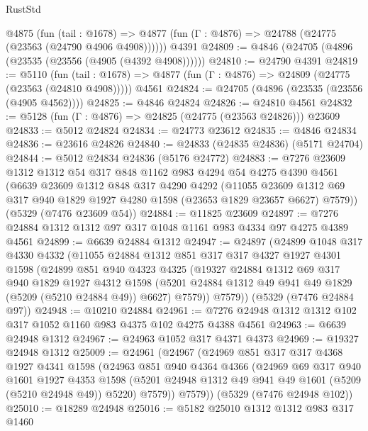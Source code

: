 \begin{lexlean}{RustStd}
\begin{coremodule}
    @4875
      (fun (tail : @1678) =>
      @4877 (fun (Γ : @4876) => @24788 (@24775 (@23563 (@24790 @4906 @4908))))))
    @4391
@24809 := @4846 (@24705 (@4896 (@23535 (@23556 (@4905 (@4392 @4908))))))
@24810 := @24790 @4391
@24819 := @5110
    (fun (tail : @1678) => @4877 (fun (Γ : @4876) => @24809 (@24775 (@23563 (@24810 @4908)))))
    @4561
@24824 := @24705 (@4896 (@23535 (@23556 (@4905 @4562))))
@24825 := @4846 @24824
@24826 := @24810 @4561
@24832 := @5128 (fun (Γ : @4876) => @24825 (@24775 (@23563 @24826))) @23609
@24833 := @5012 @24824
@24834 := @24773 @23612
@24835 := @4846 @24834
@24836 := @23616 @24826
@24840 := @24833 (@24835 @24836) (@5171 @24704)
@24844 := @5012 @24834 @24836 (@5176 @24772)
@24883 := @7276
    @23609
    @1312
    @1312
    @54
    @317
    @848
    @1162
    @983
    @4294
    @54
    @4275
    @4390
    @4561
    (@6639
      @23609
      @1312
      @848
      @317
      @4290
      @4292
      (@11055 @23609 @1312 @69 @317 @940 @1829 @1927 @4280 @1598 (@23653 @1829 @23657 @6627) @7579))
    (@5329 (@7476 @23609 @54))
@24884 := @11825 @23609
@24897 := @7276 @24884 @1312 @1312 @97 @317 @1048 @1161 @983 @4334 @97 @4275 @4389 @4561
@24899 := @6639 @24884 @1312
@24947 := @24897
    (@24899
      @1048
      @317
      @4330
      @4332
      (@11055
        @24884
        @1312
        @851
        @317
        @317
        @4327
        @1927
        @4301
        @1598
        (@24899
          @851
          @940
          @4323
          @4325
          (@19327
            @24884
            @1312
            @69
            @317
            @940
            @1829
            @1927
            @4312
            @1598
            (@5201 @24884 @1312 @49 @941 @49 @1829 (@5209 (@5210 @24884 @49)) @6627)
            @7579))
        @7579))
    (@5329 (@7476 @24884 @97))
@24948 := @10210 @24884
@24961 := @7276 @24948 @1312 @1312 @102 @317 @1052 @1160 @983 @4375 @102 @4275 @4388 @4561
@24963 := @6639 @24948 @1312
@24967 := @24963 @1052 @317 @4371 @4373
@24969 := @19327 @24948 @1312
@25009 := @24961
    (@24967
      (@24969
        @851
        @317
        @317
        @4368
        @1927
        @4341
        @1598
        (@24963
          @851
          @940
          @4364
          @4366
          (@24969
            @69
            @317
            @940
            @1601
            @1927
            @4353
            @1598
            (@5201 @24948 @1312 @49 @941 @49 @1601 (@5209 (@5210 @24948 @49)) @5220)
            @7579))
        @7579))
    (@5329 (@7476 @24948 @102))
@25010 := @18289 @24948
@25016 := @5182 @25010 @1312 @1312 @983 @317 @1460

\end{coremodule}
\end{lexlean}
